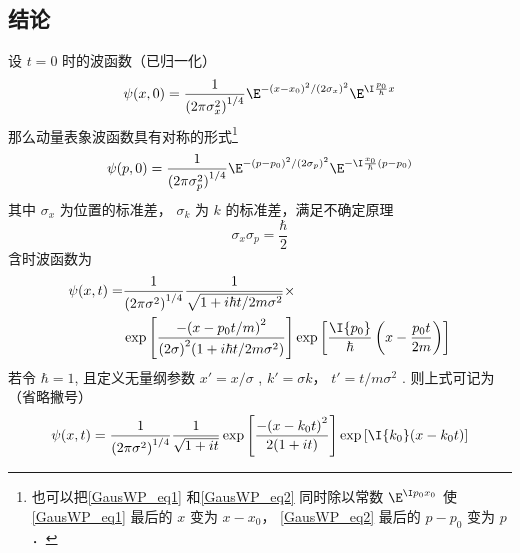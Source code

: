 

\subsection{结论}
设 $t = 0$ 时的波函数（已归一化）
\begin{equation}\label{GausWP_eq1}
\psi (x,0) = \frac{1}{{{{(2\pi {\sigma_x ^2})}^{1/4}}}}{\E^{ - {{(x - {x_0})}^2}/{{(2\sigma_x )}^2}}}{\E^{\I \frac{p_0}{\hbar}x}}
\end{equation}
那么动量表象波函数具有对称的形式\footnote{也可以把\autoref{GausWP_eq1} 和\autoref{GausWP_eq2} 同时除以常数 $\E^{\I p_0 x_0}$ 使\autoref{GausWP_eq1} 最后的 $x$ 变为 $x-x_0$， \autoref{GausWP_eq2} 最后的 $p-p_0$ 变为 $p$． }
\begin{equation}\label{GausWP_eq2}
\psi (p,0) = \frac{1}{{{{(2\pi \sigma_p^2)}^{1/4}}}}{\E^{ - {{(p - {p_0})}^2}/{{(2{\sigma_p})}^2}}}{\E^{ - \I\frac{{{x_0}}}{\hbar }(p - {p_0})}}
\end{equation}
其中 $\sigma_x$ 为位置的标准差， $\sigma_k$ 为 $k$ 的标准差，满足不确定原理
\begin{equation}
\sigma_x\sigma_p = \frac{\hbar}{2}
\end{equation}
含时波函数为
\begin{equation}\begin{aligned}
\psi (x,t) = &\frac{1}{{{{(2\pi {\sigma ^2})}^{1/4}}}}\frac{1}{{\sqrt {1 + i\hbar t/2m{\sigma ^2}} }}\times\\
&\exp \left[ {\frac{{ - {{(x - {p_0}t/m)}^2}}}{{{{(2\sigma )}^2}(1 + i\hbar t/2m{\sigma ^2})}}} \right]\exp \left[ {\frac{{\I{p_0}}}{\hbar }\left( {x - \frac{{{p_0}t}}{{2m}}} \right)} \right]
\end{aligned}\end{equation}
若令 $\hbar  = 1$, 且定义无量纲参数 $x' = x/\sigma$ ,  $k' = \sigma k$， $t' = t/m\sigma^2$  . 则上式可记为（省略撇号）
\begin{equation}
\psi (x,t) = \frac{1}{{{{(2\pi {\sigma ^2})}^{1/4}}}}\frac{1}{{\sqrt {1 + it} }}\exp \left[ {\frac{{ - {{(x - {k_0}t)}^2}}}{{2(1 + it)}}} \right]\exp \left[ {\I {k_0}(x - {k_0}t)} \right]
\end{equation}

